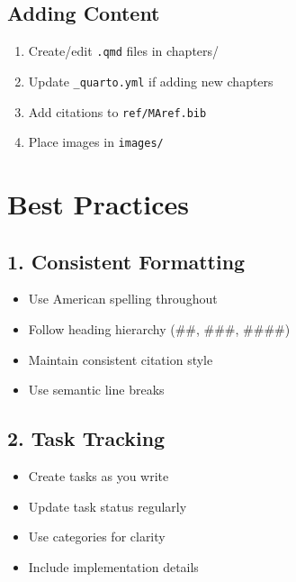 \documentclass[
  11pt,
  letterpaper,
]{book}
\providecommand{\tightlist}{%
  \setlength{\itemsep}{0pt}\setlength{\parskip}{0pt}}
\begin{document}
\subsection*{Adding Content}\label{adding-content}

\begin{enumerate}
\def\labelenumi{\arabic{enumi}.}
\tightlist
\item
  Create/edit \texttt{.qmd} files in chapters/
\item
  Update \texttt{\_quarto.yml} if adding new chapters
\item
  Add citations to \texttt{ref/MAref.bib}
\item
  Place images in \texttt{images/}
\end{enumerate}

\section*{Best Practices}\label{best-practices}


\subsection*{1. Consistent Formatting}\label{consistent-formatting}

\begin{itemize}
\tightlist
\item
  Use American spelling throughout
\item
  Follow heading hierarchy (\#\#, \#\#\#, \#\#\#\#)
\item
  Maintain consistent citation style
\item
  Use semantic line breaks
\end{itemize}

\subsection*{2. Task Tracking}\label{task-tracking}

\begin{itemize}
\tightlist
\item
  Create tasks as you write
\item
  Update task status regularly
\item
  Use categories for clarity
\item
  Include implementation details
\end{itemize}
\end{document}
